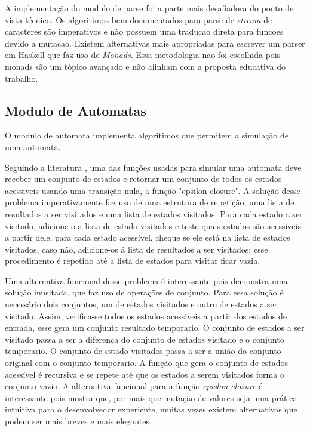 A implementação do modulo de parse foi a parte mais desafiadora do ponto de vista técnico.
Os algoritimos bem documentados para parse de \emph{stream} de caracteres são imperativos e não possuem uma traducao direta para funcoes devido a mutacao.
Existem alternativas mais apropriadas para escrever um parser em Haskell que faz uso de \emph{Monads}.
Essa metodologia nao foi escolhida pois monads são um tópico avançado e não alinham com a proposta educativa do trabalho.

\subsection{Modulo de Automatas}
O modulo de automata implementa algoritimos que permitem a simulação de uma automata.

Seguindo a literatura \cite{dragon-book}, uma das funções usadas para simular uma automata deve receber um conjunto de estados e retornar um conjunto de todos os estados acessiveis usando uma transição nula, a função "epsilon closure".
A solução desse problema imperativamente faz uso de uma estrutura de repetição, uma lista de resultados a ser visitados e uma lista de estados visitados.
Para cada estado a ser visitado, adicione-o a lista de estado visitados e teste quais estados são acessíveis a partir dele, para cada estado acessível, cheque se ele está na lista de estados visitados, caso não, adicione-os á lista de resultados a ser visitados; esse procedimento é repetido até a lista de estados para visitar ficar vazia.

Uma alternativa funcional desse problema é interessante pois demonstra uma solução inusitada, que faz uso de operações de conjunto.
Para essa solução é necessário dois conjuntos, um de estados visitados e outro de estados a ser visitado.
Assim, verifica-se todos os estados acessiveis a partir dos estados de entrada, esse gera um conjunto resultado temporario.
O conjunto de estados a ser visitado passa a ser a diferença do conjunto de estados visitado e o conjunto temporario.
O conjunto de estado visitados passa a ser a união do conjunto original com o conjunto temporario.
A função que gera o conjunto de estados acessível é recursiva e se repete até que os estados a serem visitados forma o conjunto vazio.
A alternativa funcional para a função \emph{epislon closure} é interessante pois mostra que, por mais que mutação de valores seja uma prática intuitiva para o desenvolvedor experiente, muitas vezes existem alternativas que podem ser mais breves e mais elegantes.

